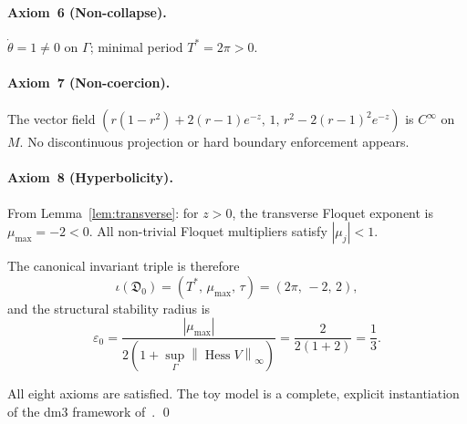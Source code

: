 \documentclass[12pt, oneside]{book}
\theoremstyle{plain}
\theoremstyle{definition}
\theoremstyle{remark}
\newcommand{\dm}{\mathfrak{D}}
\newcommand{\Orb}{\Gamma}
\newcommand{\norm}[1]{\left\|#1\right\|}
\newcommand{\abs}[1]{\left|#1\right|}
\DeclareMathOperator{\Hess}{Hess}
\begin{document}
\paragraph{Axiom~6 (Non-collapse).}
$\dot\theta=1\ne 0$ on $\Orb$; minimal period $T^*=2\pi>0$.

\paragraph{Axiom~7 (Non-coercion).}
The vector field $(r(1-r^2)+2(r-1)e^{-z},\,1,\,r^2-2(r-1)^2e^{-z})$
is $C^\infty$ on $M$. No discontinuous projection or hard boundary
enforcement appears.

\paragraph{Axiom~8 (Hyperbolicity).}
From Lemma~\ref{lem:transverse}: for $z>0$, the transverse
Floquet exponent is $\mu_{\max}=-2<0$. All non-trivial Floquet
multipliers satisfy $\abs{\mu_j}<1$.

\medskip

The canonical invariant triple is therefore
\[
  \iota(\dm_0) = (T^*,\,\mu_{\max},\,\tau)
  = (2\pi,\,-2,\,2),
\]
and the structural stability radius is
\[
  \varepsilon_0
  = \frac{\abs{\mu_{\max}}}{2(1+\sup_\Orb\norm{\Hess V}_\infty)}
  = \frac{2}{2(1+2)}
  = \frac{1}{3}.
\]

All eight axioms are satisfied. The toy model is a complete, explicit
instantiation of the dm3 framework of~\cite{Paper1}. \qed
\end{document}

